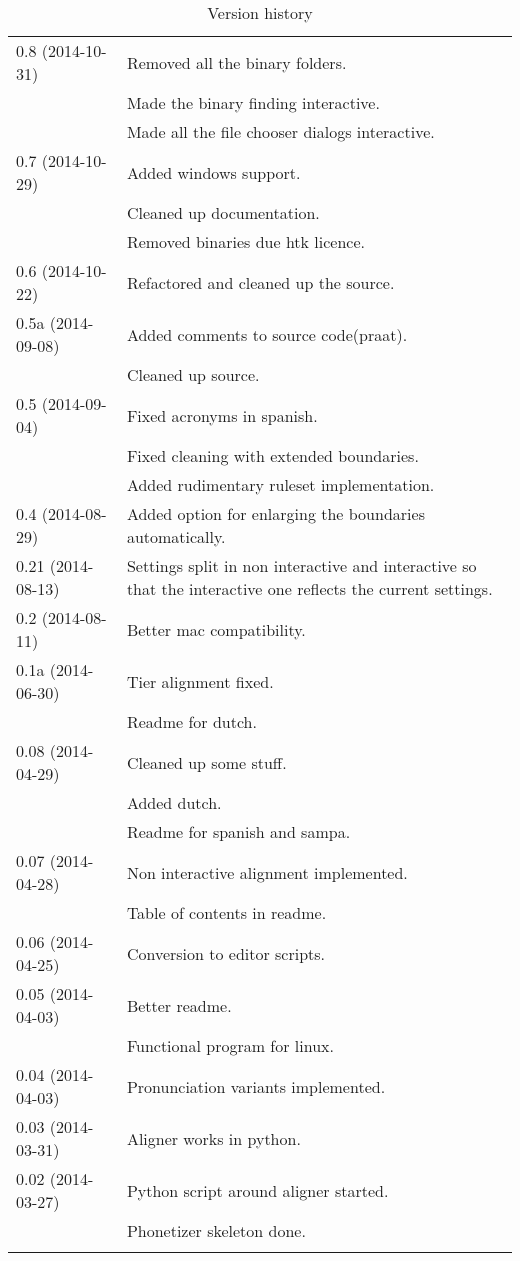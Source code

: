 \begin{longtable}{|p{0.22\linewidth}p{0.8\linewidth}|}
	\hline
	0.8 (2014-10-31) & \tabitem Removed all the binary folders.\\
		& \tabitem Made the binary finding interactive.\\
		& \tabitem Made all the file chooser dialogs interactive.\\
	\hline
	0.7 (2014-10-29) & \tabitem Added windows support.\\
		&	\tabitem Cleaned up documentation.\\
		& \tabitem Removed binaries due htk licence.\\
	\hline
	0.6 (2014-10-22) & \tabitem Refactored and cleaned up the source.\\
	\hline
	0.5a (2014-09-08) & \tabitem Added comments to source code(praat).\\
		& \tabitem Cleaned up source.\\
	\hline
	0.5 (2014-09-04) & \tabitem Fixed acronyms in spanish.\\
		& \tabitem Fixed cleaning with extended boundaries.\\
		& \tabitem Added rudimentary ruleset implementation.\\
	\hline
	0.4 (2014-08-29) & \tabitem Added option for enlarging the boundaries
automatically.\\
	\hline
	0.21 (2014-08-13) & \tabitem Settings split in non interactive and
interactive so that the interactive one reflects the current settings.\\
	\hline
	0.2 (2014-08-11) & \tabitem Better mac compatibility.\\
	\hline
	0.1a (2014-06-30) & \tabitem Tier alignment fixed.\\
		& \tabitem Readme for dutch.\\
	\hline
	0.08 (2014-04-29) & \tabitem Cleaned up some stuff.\\
		& \tabitem Added dutch.\\
		& \tabitem Readme for spanish and sampa.\\
	\hline
	0.07 (2014-04-28) & \tabitem Non interactive alignment implemented.\\
		& \tabitem Table of contents in readme.\\
	\hline
	0.06 (2014-04-25) & \tabitem Conversion to editor scripts.\\
	\hline
	0.05 (2014-04-03) & \tabitem Better readme.\\
		& \tabitem Functional program for linux.\\
	\hline
	0.04 (2014-04-03) & \tabitem Pronunciation variants implemented.\\
	\hline
	0.03 (2014-03-31) & \tabitem Aligner works in python.\\
	\hline
	0.02 (2014-03-27) & \tabitem Python script around aligner started.\\
		& \tabitem Phonetizer skeleton done.\\
	\hline
	\caption{Version history}
\end{longtable}





